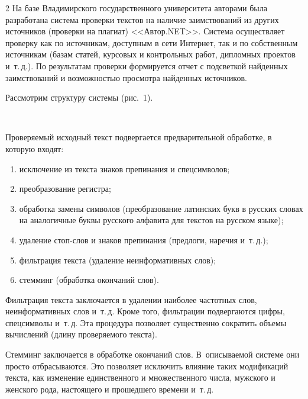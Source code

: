 \begin{multicols}{2}
  На базе Владимирского государственного университета авторами была 
разработана сис\-те\-ма проверки текстов на наличие заимствований из других 
источников (проверки на плагиат) <<Автор.NET>>. Сис\-те\-ма осуществляет 
проверку как по источникам, доступным в сети Интернет, так и по собственным 
источникам (базам статей, курсовых и контрольных работ, дипломных 
проектов и~т.\,д.). По результатам проверки формируется отчет с подсветкой 
найденных заимствований и воз\-мож\-ностью просмотра найденных источников.

Рассмотрим структуру сис\-те\-мы (рис.~1).

\begin{figure}
\vspace*{1pt}
 \begin{center}
 \mbox{%
 \epsfxsize=104.248mm
 }
 \end{center}
 \vspace*{-9pt}
\vspace*{6pt}
\end{figure}

  Проверяемый исходный текст подвергается предварительной обработке, в 
которую входят:
  \begin{enumerate}[(1)]
  \item исключение из текста знаков препинания и спецсимволов;
  \item преобразование регистра;
  \item обработка замены символов (преобразование латинских букв в русских 
словах на аналогичные буквы русского алфавита для текстов на русском языке);
  \item удаление стоп-слов и знаков препинания (предлоги, наречия и~т.\,д.);
  \item фильтрация текста (удаление неинформативных слов);
  \item стемминг (обработка окончаний слов).
  \end{enumerate}
  
  Фильтрация текста заключается в удалении наиболее частотных слов, 
неинформативных слов и~т.\,д. Кроме того, фильтрации подвергаются цифры, 
спецсимволы и~т.\,д. Эта процедура позволяет существенно сократить объемы 
вычислений (длину проверяемого текста). 
  
  Стемминг заключается в обработке окончаний слов. В~описываемой 
  сис\-те\-ме они просто отбрасываются. Это позволяет исключить влияние 
таких модификаций текста, как изменение единственного и множественного 
числа, мужского и женского рода, настоящего и прошедшего времени и~т.\,д.
  

\end{multicols}
